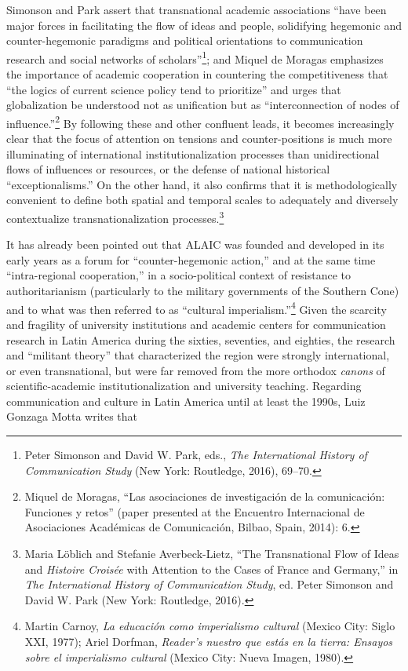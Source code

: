 \documentclass{tufte-handout}
\begin{document}
Simonson and Park assert that transnational academic associations ``have
been major forces in facilitating the flow of ideas and people,
solidifying hegemonic and counter-hegemonic paradigms and political
orientations to communication research and social networks of
scholars''\footnote{Peter Simonson and David W. Park, eds., \emph{The
  International History of Communication Study} (New York: Routledge,
  2016), 69--70.}; and Miquel de Moragas emphasizes the importance of
academic cooperation in countering the competitiveness that ``the logics
of current science policy tend to prioritize'' and urges that
globalization be understood not as unification but as ``interconnection
of nodes of influence.''\footnote{Miquel de Moragas, ``Las asociaciones
  de investigación de la comunicación: Funciones y retos'' (paper
  presented at the Encuentro Internacional de Asociaciones Académicas de
  Comunicación, Bilbao, Spain, 2014): 6.} By following these and other
confluent leads, it becomes increasingly clear that the focus of
attention on tensions and counter-positions is much more illuminating of
international institutionalization processes than unidirectional flows
of influences or resources, or the defense of national historical
``exceptionalisms.'' On the other hand, it also confirms that it is
methodologically convenient to define both spatial and temporal scales
to adequately and diversely contextualize transnationalization
processes.\footnote{Maria Löblich and Stefanie Averbeck-Lietz, ``The
  Transnational Flow of Ideas and \emph{Histoire Croisée} with Attention
  to the Cases of France and Germany,'' in \emph{The International
  History of Communication Study}, ed. Peter Simonson and David W. Park
  (New York: Routledge, 2016).}

It has already been pointed out that ALAIC was founded and developed in
its early years as a forum for ``counter-hegemonic action,'' and at the
same time ``intra-regional cooperation,'' in a socio-political context
of resistance to authoritarianism (particularly to the military
governments of the Southern Cone) and to what was then referred to as
``cultural imperialism.''\footnote{Martin Carnoy, \emph{La educación
  como imperialismo cultural} (Mexico City: Siglo XXI, 1977); Ariel
  Dorfman, \emph{Reader's nuestro que estás en la tierra: Ensayos sobre
  el imperialismo cultural} (Mexico City: Nueva Imagen, 1980).} Given
the scarcity and fragility of university institutions and academic
centers for communication research in Latin America during the sixties,
seventies, and eighties, the research and ``militant theory'' that
characterized the region were strongly international, or even
transnational, but were far removed from the more orthodox \emph{canons}
of scientific-academic institutionalization and university teaching.
Regarding communication and culture in Latin America until at least the
1990s, Luiz Gonzaga Motta writes that
\end{document}
